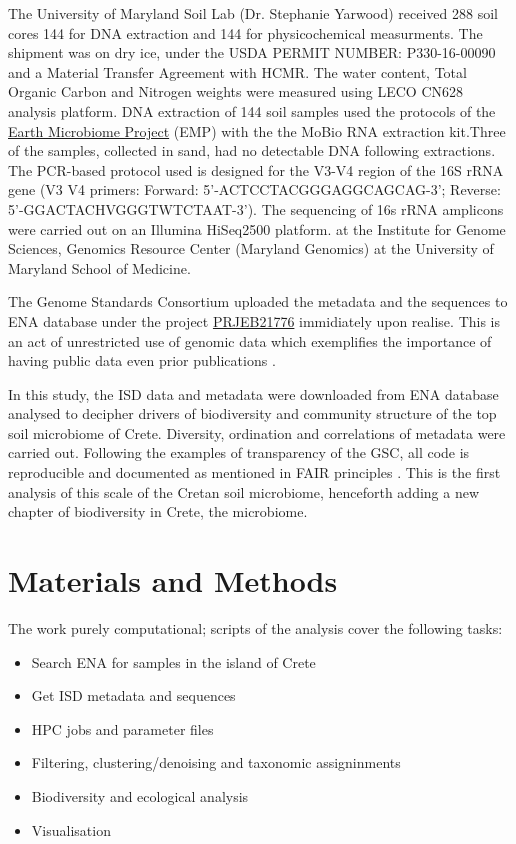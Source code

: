 The University of Maryland Soil Lab (Dr. Stephanie Yarwood) received 288 soil cores
144 for DNA extraction and 144 for physicochemical measurments. The shipment was on dry ice,
under the USDA PERMIT NUMBER: P330-16-00090 and a Material Transfer Agreement with HCMR.
The water content, Total Organic Carbon and Nitrogen weights were measured using LECO CN628 analysis platform.
DNA extraction of 144 soil samples used the protocols of the \href{https://www.protocols.io/view/emp-16s-illumina-amplicon-protocol-cpisvkee}{Earth Microbiome Project} (EMP)
with the the MoBio RNA extraction kit.Three of the samples, collected in sand, had no detectable DNA
following extractions.
The PCR-based protocol used is designed for the V3-V4 region of the 16S rRNA gene (V3 V4 primers: Forward: 5'-ACTCCTACGGGAGGCAGCAG-3'; Reverse: 5'-GGACTACHVGGGTWTCTAAT-3').
The sequencing of 16s rRNA amplicons were carried out on an Illumina HiSeq2500 platform.
at the Institute for Genome Sciences, Genomics Resource Center (Maryland Genomics) at the University of Maryland School of Medicine.

The Genome Standards Consortium uploaded the metadata and the sequences to ENA
database under the project \href{https://www.ebi.ac.uk/ena/browser/view/PRJEB21776}{PRJEB21776} immidiately upon realise. 
This is an act of unrestricted use of genomic data which exemplifies the importance of 
having public data even prior publications \parencite{kopf_2015}.

In this study, the ISD data and metadata were downloaded from ENA database analysed to decipher drivers of 
biodiversity and community structure of the top soil microbiome of Crete. Diversity, 
ordination and correlations of metadata were carried out. Following the examples of 
transparency of the GSC, all code is reproducible and documented as mentioned in FAIR principles \parencite{wilkinson2016the-fair}.
This is the first analysis 
of this scale of the Cretan soil microbiome, henceforth adding a new chapter of 
biodiversity in Crete, the microbiome.

\section{Materials and Methods}\label{isd_methods}

The work purely computational; scripts of the analysis cover the following tasks:
\begin{itemize}
    \item Search ENA for samples in the island of Crete
    \item Get ISD metadata and sequences
    \item HPC jobs and parameter files
    \item Filtering, clustering/denoising and taxonomic assigninments
    \item Biodiversity and ecological analysis 
    \item Visualisation
\end{itemize}

